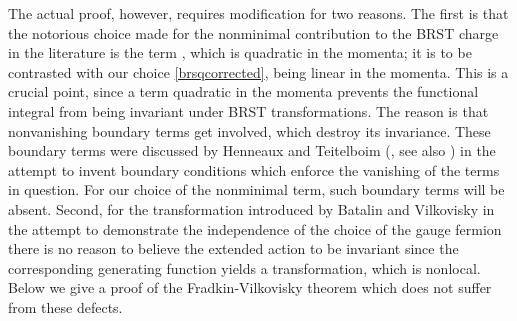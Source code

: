 \documentclass[a4paper,10pt]{article}
\begin{document}
The actual proof, however, requires modification for two reasons. The first is that the 
notorious choice made for the nonminimal contribution to the BRST 
charge in the literature is the term \coordHE{}, which is quadratic in the momenta; it is to 
be contrasted with our choice \eqref{brsqcorrected}, being linear in the momenta. This is 
a crucial point, since a term quadratic in the momenta prevents the functional integral 
from being invariant under BRST transformations. The reason is that nonvanishing boundary 
terms get involved, which destroy its invariance. These boundary terms were discussed by 
Henneaux and Teitelboim (\cite{Henn 85,Henn 92,Henn 92a}, see also \cite{Fadd 69}) in the 
attempt to invent boundary conditions which enforce the vanishing of the terms in 
question. For our choice of the nonminimal term, such boundary terms will be absent. 
Second, for the transformation introduced by Batalin and Vilkovisky in the attempt to 
demonstrate the independence of the choice of the gauge fermion there is no reason to 
believe the extended action to be invariant since the corresponding generating function 
yields a transformation, which is nonlocal. Below we give a proof of the 
Fradkin-Vilkovisky theorem which does not suffer from these defects.
\end{document}
